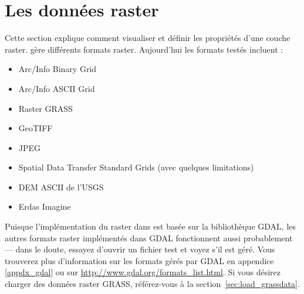 \chapter{Les données raster}\label{label_raster}


Cette section explique comment visualiser et définir les propriétés d'une couche raster. \qg gère différents formats raster. Aujourd'hui les formats testés
incluent :
\begin{itemize}[label=--]
\item Arc/Info Binary Grid
\item Arc/Info ASCII Grid
\item Raster GRASS
\item GeoTIFF
\item JPEG
\item Spatial Data Transfer Standard Grids (avec quelques limitations)
\item DEM ASCII de l'USGS
\item Erdas Imagine
\end{itemize}

Puisque l'implémentation du raster dans \qg est basée sur la bibliothèque
GDAL, les autres formats raster implémentés dans GDAL fonctionnent aussi
probablement — dans le doute, essayez d'ouvrir un fichier test et voyez s'il est
géré. Vous trouverez plus d'information sur les formats gérés par GDAL  en
appendice \ref{appdx_gdal}  ou sur
\url{http://www.gdal.org/formats_list.html}. Si vous désirez charger des
données raster GRASS, référez-vous à la section~\ref{sec:load_grassdata}.

